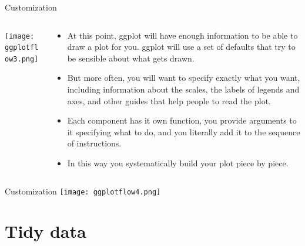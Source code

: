 \documentclass[10pt,handout]{beamer}\usepackage[]{graphicx}\usepackage[]{color}
\begin{document}
\begin{frame}{Customization}
	\begin{columns}
		\begin{column}{0.5\textwidth}  %
			\begin{center}
				\texttt{[image: ggplotflow3.png]}
			\end{center}
		\end{column}
		\begin{column}{0.5\textwidth}
			\begin{itemize}
				\item At this point, ggplot will have enough information to be able to draw
				a plot for you. ggplot will use a set of defaults that try to be sensible about what gets drawn. 
				\item But more often, you will want to specify exactly what you want, including
				information about the scales, the labels of legends and axes, and
				other guides that help people to read the plot. 
				\item Each component has it own function, you provide arguments to it
				specifying what to do, and you literally add it to the sequence of
				instructions. 
				\item In this way you systematically build your plot piece by
				piece.
			\end{itemize}
		\end{column}
	\end{columns}
\end{frame}



\begin{frame}{Customization}
	\centering
	\texttt{[image: ggplotflow4.png]}
\end{frame}


	
\section{Tidy data}
\end{document}
